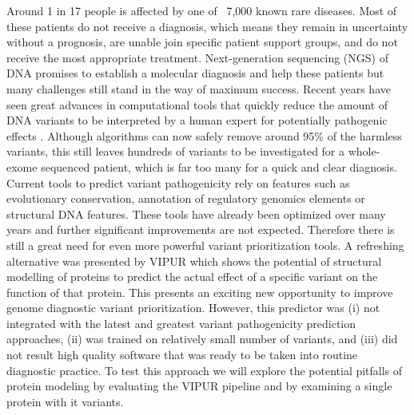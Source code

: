 Around 1 in 17 people is affected by one of ~7,000 known rare diseases. Most of these patients do not receive a diagnosis, which means they remain in uncertainty without a prognosis, are unable join specific patient support groups, and do not receive the most appropriate treatment.
Next-generation sequencing (NGS) of DNA promises to establish a molecular diagnosis and help these patients but many challenges still stand in the way of maximum success.
Recent years have seen great advances in computational tools that quickly reduce the amount of DNA variants to be interpreted by a human expert for potentially pathogenic effects \cite{}. Although algorithms can now safely remove around 95\% of the harmless variants, this still leaves hundreds of variants to be investigated for a whole-exome sequenced patient, which is far too many for a quick and clear diagnosis. Current tools to predict variant pathogenicity rely on features such as evolutionary conservation, annotation of regulatory genomics elements or structural DNA features. These tools have already been optimized over many years and further significant improvements are not expected. Therefore there is still a great need for even more powerful variant prioritization tools. 
A refreshing alternative was presented by VIPUR \cite{} which shows the potential of structural modelling of proteins to predict the actual effect of a specific variant on the function of that protein. This presents an exciting new opportunity to improve genome diagnostic variant prioritization. However, this predictor was (i) not integrated with the latest and greatest variant pathogenicity prediction approaches, (ii) was trained on relatively small number of variants, and (iii) did not result high quality software that was ready to be taken into routine diagnostic practice.
To test this approach we will explore the potential pitfalls of protein modeling by evaluating the VIPUR pipeline and by examining a single protein with it variants.